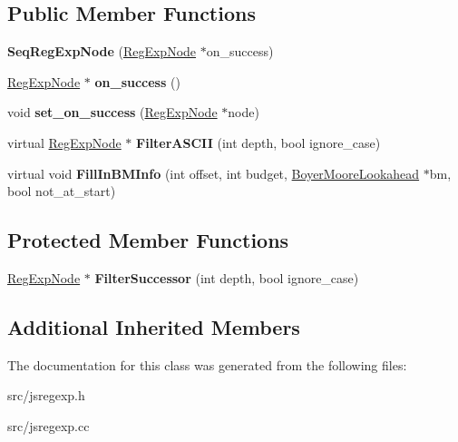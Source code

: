 \subsection*{Public Member Functions}
\begin{DoxyCompactItemize}
\item 
\hypertarget{classv8_1_1internal_1_1_seq_reg_exp_node_ad6c7861c1161e0719546cb02c06879fd}{}{\bfseries Seq\+Reg\+Exp\+Node} (\hyperlink{classv8_1_1internal_1_1_reg_exp_node}{Reg\+Exp\+Node} $\ast$on\+\_\+success)\label{classv8_1_1internal_1_1_seq_reg_exp_node_ad6c7861c1161e0719546cb02c06879fd}

\item 
\hypertarget{classv8_1_1internal_1_1_seq_reg_exp_node_aade3ae76f2c2916714211c0742cfd739}{}\hyperlink{classv8_1_1internal_1_1_reg_exp_node}{Reg\+Exp\+Node} $\ast$ {\bfseries on\+\_\+success} ()\label{classv8_1_1internal_1_1_seq_reg_exp_node_aade3ae76f2c2916714211c0742cfd739}

\item 
\hypertarget{classv8_1_1internal_1_1_seq_reg_exp_node_ac45d92508b35fc098a43ee36f46cac29}{}void {\bfseries set\+\_\+on\+\_\+success} (\hyperlink{classv8_1_1internal_1_1_reg_exp_node}{Reg\+Exp\+Node} $\ast$node)\label{classv8_1_1internal_1_1_seq_reg_exp_node_ac45d92508b35fc098a43ee36f46cac29}

\item 
\hypertarget{classv8_1_1internal_1_1_seq_reg_exp_node_aa3c3309b02891e2a08e0adf03ba7b3e9}{}virtual \hyperlink{classv8_1_1internal_1_1_reg_exp_node}{Reg\+Exp\+Node} $\ast$ {\bfseries Filter\+A\+S\+C\+I\+I} (int depth, bool ignore\+\_\+case)\label{classv8_1_1internal_1_1_seq_reg_exp_node_aa3c3309b02891e2a08e0adf03ba7b3e9}

\item 
\hypertarget{classv8_1_1internal_1_1_seq_reg_exp_node_a3bdcbf55167ca8b2bf38be6aeed4e928}{}virtual void {\bfseries Fill\+In\+B\+M\+Info} (int offset, int budget, \hyperlink{classv8_1_1internal_1_1_boyer_moore_lookahead}{Boyer\+Moore\+Lookahead} $\ast$bm, bool not\+\_\+at\+\_\+start)\label{classv8_1_1internal_1_1_seq_reg_exp_node_a3bdcbf55167ca8b2bf38be6aeed4e928}

\end{DoxyCompactItemize}
\subsection*{Protected Member Functions}
\begin{DoxyCompactItemize}
\item 
\hypertarget{classv8_1_1internal_1_1_seq_reg_exp_node_a3593e5af0b3f8ca04a685c59536db0be}{}\hyperlink{classv8_1_1internal_1_1_reg_exp_node}{Reg\+Exp\+Node} $\ast$ {\bfseries Filter\+Successor} (int depth, bool ignore\+\_\+case)\label{classv8_1_1internal_1_1_seq_reg_exp_node_a3593e5af0b3f8ca04a685c59536db0be}

\end{DoxyCompactItemize}
\subsection*{Additional Inherited Members}


The documentation for this class was generated from the following files\+:\begin{DoxyCompactItemize}
\item 
src/jsregexp.\+h\item 
src/jsregexp.\+cc\end{DoxyCompactItemize}
